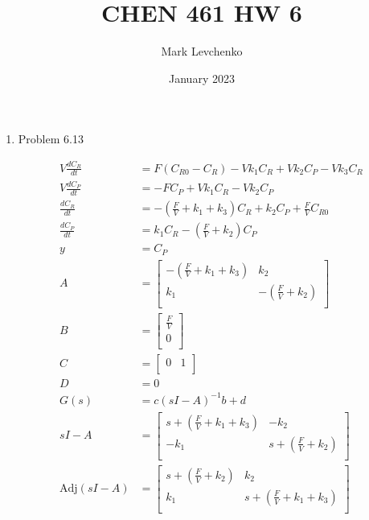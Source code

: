 \documentclass[12pt]{article}
\title{CHEN 461 HW 6}
\author{Mark Levchenko}
\date{January 2023}
\begin{document}
\begin{enumerate}

\newpage
\item Problem 6.13

\begin{align*}
    V \frac{dC_R}{dt} &= F (C_{R0} - C_R) - V k_1 C_R + V k_2 C_P - V k_3 C_R \\
    V \frac{dC_P}{dt} &= -F C_P + V k_1 C_R - V k_2 C_P \\
    \frac{dC_R}{dt} &= - \left(\frac{F}{V} + k_1 + k_3\right) C_R + k_2 C_P + \frac{F}{V} C_{R0} \\
    \frac{dC_P}{dt} &= k_1 C_R - \left(\frac{F}{V} + k_2\right) C_P \\
    y &= C_P \\
    A &= \begin{bmatrix}
        - \left(\frac{F}{V} + k_1 + k_3\right) & k_2 \\
        k_1 & - \left(\frac{F}{V} + k_2\right) \\
    \end{bmatrix} \\
    B &= \begin{bmatrix}
        \frac{F}{V} \\
        0 \\
    \end{bmatrix} \\
    C &= \begin{bmatrix}
        0 & 1 \\
    \end{bmatrix} \\
    D &= 0 \\
    G(s) &= c \left(s I - A\right)^{-1} b + d \\
    s I - A &= \begin{bmatrix}
        s + \left(\frac{F}{V} + k_1 + k_3\right) & - k_2 \\
        - k_1 & s + \left(\frac{F}{V} + k_2\right) \\
    \end{bmatrix} \\
    \mathrm{Adj}(s I - A) &= \begin{bmatrix}
        s + \left(\frac{F}{V} + k_2\right) & k_2 \\
        k_1 & s + \left(\frac{F}{V} + k_1 + k_3\right) \\
    \end{bmatrix} \\

\end{align*}
\end{enumerate}
\end{document}
